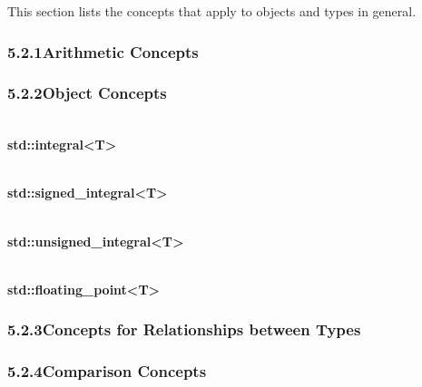 

This section lists the concepts that apply to objects and types in general.



\subsubsection*{ 5.2.1\hspace{0.2cm}Arithmetic Concepts}
\subsubsection*{ 5.2.2\hspace{0.2cm}Object Concepts}


\noindent
\hspace*{\fill} \\ %
\textbf{std::integral<T>}


\noindent
\hspace*{\fill} \\ %
\textbf{std::signed\_integral<T>}


\noindent
\hspace*{\fill} \\ %
\textbf{std::unsigned\_integral<T>}


\noindent
\hspace*{\fill} \\ %
\textbf{std::floating\_point<T>}

\subsubsection*{ 5.2.3\hspace{0.2cm}Concepts for Relationships between Types}




\subsubsection*{ 5.2.4\hspace{0.2cm}Comparison Concepts}
